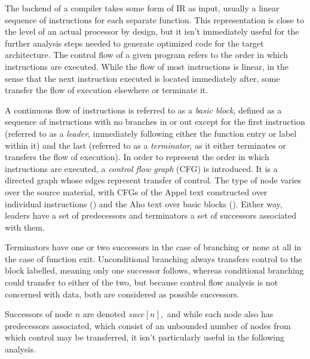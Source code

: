\documentclass{article}
\begin{document}


The backend of a compiler takes some form of IR as input, usually a linear sequence of instructions for each separate function. This representation is close to the level of an actual processor by design, but it isn't immediately useful for the further analysis steps needed to generate optimized code for the target architecture. %
The control flow of a given program refers to the order in which instructions are executed. While the flow of most instructions is linear, in the sense that the next instruction executed is located immediately after, some transfer the flow of execution elsewhere or terminate it. %


A continuous flow of instructions is referred to as a \textit{basic block}, defined as a sequence of instructions with no branches in or out except for the first instruction (referred to as a \textit{leader}, immediately following either the function entry or label within it) and the last (referred to as a \textit{terminator}, as it either terminates or transfers the flow of execution). %
In order to represent the order in which instructions are executed, a \textit{control flow graph} (CFG) is introduced. It is a directed graph whose edges represent transfer of control. The type of node varies over the source material, with CFGs of the Appel text constructed over individual instructions (\cite{tiger}) and the Aho text over basic blocks (\cite{dragon}).
Either way, leaders have a set of predecessors and terminators a set of successors associated with them.

Terminators have one or two successors in the case of branching or none at all in the case of function exit. %
Unconditional branching always transfers control to the block labelled, meaning only one successor follows, whereas conditional branching could transfer to either of the two, but because control flow analysis is not concerned with data, both are considered as possible successors. %

Successors of node \(n\) are denoted \( \mathit{succ}[n], \)
and while each node also has predecessors associated, which consist of an  unbounded number of nodes from which control may be transferred, it isn't particularly useful in the following analysis.
\end{document}
